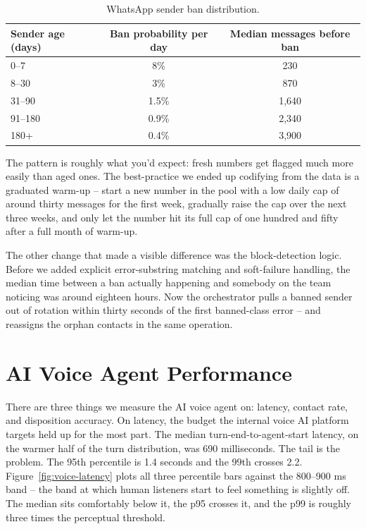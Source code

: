 \begin{table}[H]
\centering
\caption{WhatsApp sender ban distribution.}
\label{tab:wa-bans}
\begin{tabularx}{\textwidth}{l c c}
\toprule
\textbf{Sender age (days)} & \textbf{Ban probability per day} & \textbf{Median messages before ban} \\
\midrule
0--7      & 8\%   & 230 \\
8--30     & 3\%   & 870 \\
31--90    & 1.5\% & 1{,}640 \\
91--180   & 0.9\% & 2{,}340 \\
180+      & 0.4\% & 3{,}900 \\
\bottomrule
\end{tabularx}
\end{table}

The pattern is roughly what you'd expect: fresh numbers get flagged much more easily than aged ones. The best-practice we ended up codifying from the data is a graduated warm-up -- start a new number in the pool with a low daily cap of around thirty messages for the first week, gradually raise the cap over the next three weeks, and only let the number hit its full cap of one hundred and fifty after a full month of warm-up.

The other change that made a visible difference was the block-detection logic. Before we added explicit error-substring matching and soft-failure handling, the median time between a ban actually happening and somebody on the team noticing was around eighteen hours. Now the orchestrator pulls a banned sender out of rotation within thirty seconds of the first banned-class error -- and reassigns the orphan contacts in the same operation.

\section{AI Voice Agent Performance}
There are three things we measure the AI voice agent on: latency, contact rate, and disposition accuracy. On latency, the budget the internal voice AI platform targets held up for the most part. The median turn-end-to-agent-start latency, on the warmer half of the turn distribution, was 690 milliseconds. The tail is the problem. The 95th percentile is 1.4 seconds and the 99th crosses 2.2. Figure~\ref{fig:voice-latency} plots all three percentile bars against the 800--900 ms band -- the band at which human listeners start to feel something is slightly off. The median sits comfortably below it, the p95 crosses it, and the p99 is roughly three times the perceptual threshold.

